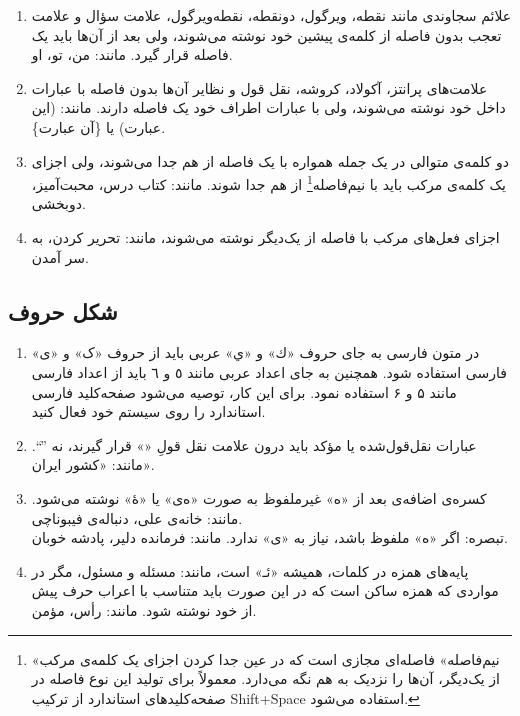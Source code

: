 \begin{enumerate}

\item 
علائم سجاوندی مانند نقطه، ویرگول، دونقطه، نقطه‌ویرگول، علامت سؤال و علامت تعجب %
بدون فاصله از کلمه‌ی پیشین خود نوشته می‌شوند، ولی بعد از آن‌ها باید یک فاصله‌ قرار گیرد. مانند: من، تو، او.
\item 
علامت‌های پرانتز، آکولاد، کروشه، نقل قول و نظایر آن‌ها بدون فاصله با عبارات داخل خود نوشته می‌شوند، ولی با عبارات اطراف خود یک فاصله دارند. مانند: (این عبارت) یا \{آن عبارت\}.
\item 
دو کلمه‌ی متوالی در یک جمله همواره با یک فاصله از هم جدا می‌شوند، ولی اجزای یک کلمه‌ی مرکب باید با نیم‌فاصله\footnote{«نیم‌فاصله» فاصله‌‌ای مجازی است که در عین جدا کردن اجزای یک کلمه‌ی مرکب از یک‌دیگر، آن‌ها را نزدیک به هم نگه می‌دارد. معمولاً برای تولید این نوع فاصله در صفحه‌کلید‌های استاندارد از ترکیب Shift+Space استفاده می‌شود.}‌‌
 از هم جدا شوند. مانند: کتاب درس، محبت‌آمیز، دوبخشی.
 \item 
 اجزای فعل‌های مرکب با فاصله از یک‌دیگر نوشته می‌شوند، مانند: تحریر کردن، به سر آمدن.
\end{enumerate}


\subsection{شکل حروف}

\begin{enumerate}

\item 
در متون فارسی به جای حروف «ك» و «ي» عربی باید از حروف «ک» و «ی» فارسی استفاده شود. همچنین به جای اعداد عربی مانند ٥ و ٦ باید از اعداد فارسی مانند ۵ و ۶ استفاده نمود. 
برای این کار، توصیه می‌شود صفحه‌کلید‌ فارسی استاندارد را روی سیستم خود فعال کنید.
\item 
عبارات نقل‌قول‌شده یا مؤکد باید درون علامت نقل قولِ «» قرار گیرند، نه ''``. مانند: «کشور ایران».
\item 
کسره‌ی اضافه‌ی بعد از «ه» غیرملفوظ به صورت «ه‌ی» یا «هٔ» نوشته می‌شود. مانند: خانه‌ی علی، دنباله‌ی فیبوناچی.
\\
تبصره‌: اگر «ه» ملفوظ باشد، نیاز به «‌ی» ندارد. مانند: فرمانده دلیر، پادشه خوبان. 

\item 
پایه‌های همزه در کلمات، همیشه «ئـ» است، مانند: مسئله و مسئول، مگر در مواردی که همزه ساکن است که در این ‌صورت باید متناسب با اعراب حرف پیش از خود نوشته شود. مانند: رأس، مؤمن. 

\end{enumerate}


